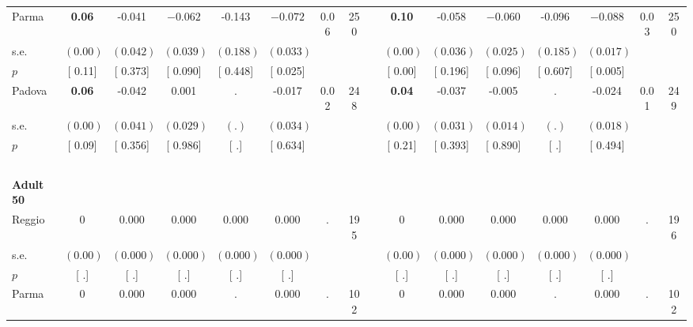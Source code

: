 \begin{longtable}{L{8em} c c c c c c c p{1em} c c c c c c c}
\quad \quad \quad Parma& \textbf{     0.06} &    -0.041 & $ \mathbf{   -0.062}$ &    -0.143 & $ \mathbf{   -0.072}$ &      0.06 &       250 & & \textbf{     0.10} &    -0.058 & $ \mathbf{   -0.060}$ &    -0.096 & $ \mathbf{   -0.088}$ &      0.03 &       250  \\*
\quad \quad \quad \quad s.e.& $ (     0.00)$ & $ (    0.042)$ & $ (    0.039)$ & $ (    0.188)$ & $ (    0.033)$ & & & & $ (     0.00)$ & $ (    0.036)$ & $ (    0.025)$ & $ (    0.185)$ & $ (    0.017)$ & &  \\*
\quad \quad \quad \quad $ p$ & [     0.11] & [    0.373] & [    0.090] & [    0.448] & [    0.025] & & & & [     0.00] & [    0.196] & [    0.096] & [    0.607] & [    0.005] & &  \\[1em]
\quad \quad \quad Padova& \textbf{     0.06} &    -0.042 &     0.001 &         . &    -0.017 &      0.02 &       248 & & \textbf{     0.04} &    -0.037 &    -0.005 &         . &    -0.024 &      0.01 &       249  \\*
\quad \quad \quad \quad s.e.& $ (     0.00)$ & $ (    0.041)$ & $ (    0.029)$ & $ (        .)$ & $ (    0.034)$ & & & & $ (     0.00)$ & $ (    0.031)$ & $ (    0.014)$ & $ (        .)$ & $ (    0.018)$ & &  \\*
\quad \quad \quad \quad $ p$ & [     0.09] & [    0.356] & [    0.986] & [        .] & [    0.634] & & & & [     0.21] & [    0.393] & [    0.890] & [        .] & [    0.494] & &  \\[1em]
~\\[1em]
\quad \quad \textbf{Adult 50} & & & & & & & & & & & & & & & \\* 
\quad \quad \quad Reggio& 0 &     0.000 &     0.000 &     0.000 &     0.000 &         . &       195 & & 0 &     0.000 &     0.000 &     0.000 &     0.000 &         . &       196  \\*
\quad \quad \quad \quad s.e.& $ (     0.00)$ & $ (    0.000)$ & $ (    0.000)$ & $ (    0.000)$ & $ (    0.000)$ & & & & $ (     0.00)$ & $ (    0.000)$ & $ (    0.000)$ & $ (    0.000)$ & $ (    0.000)$ & &  \\*
\quad \quad \quad \quad $ p$ & [        .] & [        .] & [        .] & [        .] & [        .] & & & & [        .] & [        .] & [        .] & [        .] & [        .] & &  \\[1em]
\quad \quad \quad Parma& 0 &     0.000 &     0.000 &         . &     0.000 &         . &       102 & & 0 &     0.000 &     0.000 &         . &     0.000 &         . &       102  \\*

\end{longtable}
